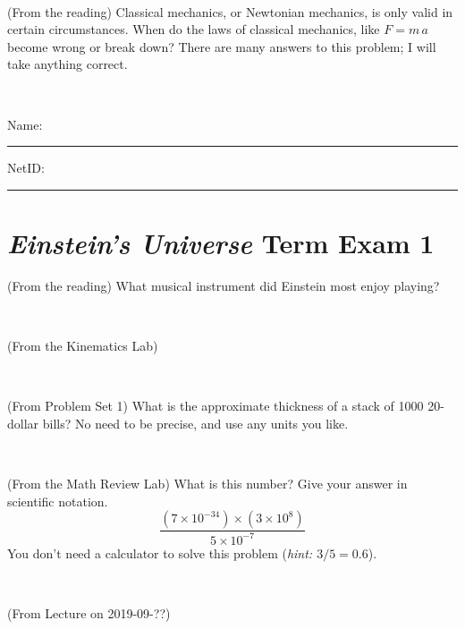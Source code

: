 \documentclass[12pt, letterpaper]{article}
\begin{document}
\vfill ~

\begin{problem} (From the reading)
Classical mechanics, or Newtonian mechanics, is only valid in certain
circumstances. When do the laws of classical mechanics, like $F =
m\,a$ become wrong or break down? There are many answers to this
problem; I will take anything correct.
\end{problem}


\vfill ~


\cleardoublepage



\noindent
Name: \rule[-1ex]{0.60\textwidth}{0.1pt}
NetID: \rule[-1ex]{0.20\textwidth}{0.1pt}

\section*{\textsl{Einstein's Universe} Term Exam 1}
\setcounter{problem}{1}


\begin{problem} (From the reading)
What musical instrument did Einstein most enjoy playing?
\end{problem}


\vfill ~

\begin{problem} (From the Kinematics Lab)

\end{problem}


\vfill ~

\begin{problem} (From Problem Set 1)
What is the approximate thickness of a stack of 1000 20-dollar bills?
No need to be precise, and use any units you like.
\end{problem}


\vfill ~

\begin{problem} (From the Math Review Lab)
What is this number? Give your answer in scientific notation.
$$
\frac{(7\times10^{-34})\times(3\times10^8)}{5\times10^{-7}}
$$
You don't need a calculator to solve this problem (\textit{hint: $3/5=0.6$}).
\end{problem}


\vfill ~


\clearpage


\begin{problem} (From Lecture on 2019-09-??)
\end{problem}


\vfill ~
\end{document}
